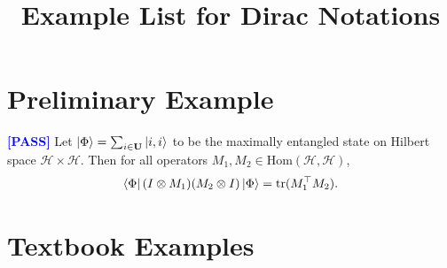 \documentclass[manuscript, review, timestamp]{acmart}
\newcommand{\tr}{\mathrm{tr}}
\newcommand{\pass}{\textcolor{blue}{\textbf{ [PASS] }}}
\begin{document}
\title{Example List for Dirac Notations}



\begin{abstract}
\end{abstract}



\maketitle


\section{Preliminary Example}
\begin{example}
  \pass Let $\ket{\Phi} = \sum_{i \in \mathbf{U}}\ket{i, i}$ to be the maximally entangled state on Hilbert space $\mathcal{H}\times\mathcal{H}$. Then for all operators $M_1, M_2 \in \mathrm{Hom}(\mathcal{H}, \mathcal{H})$,
  $$
  \bra{\Phi} (I \otimes M_1) (M_2 \otimes I) \ket{\Phi} = \tr(M_1^\top M_2).
  $$
\end{example}

\section{Textbook Examples}
\end{document}
